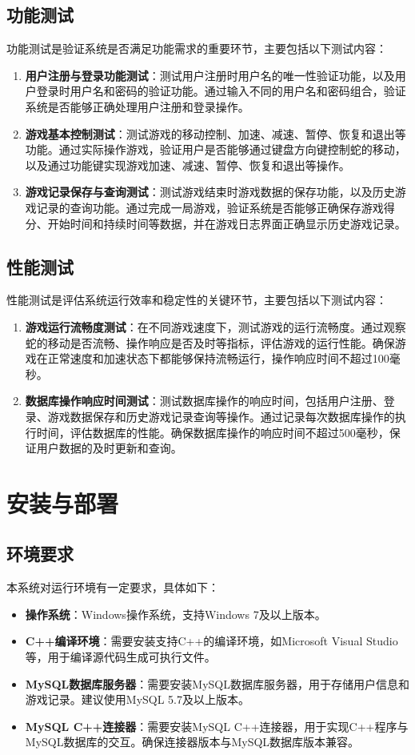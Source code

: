 \documentclass{article}
\begin{document}
\subsection{功能测试}
功能测试是验证系统是否满足功能需求的重要环节，主要包括以下测试内容：
\begin{enumerate}
    \item \textbf{用户注册与登录功能测试}：测试用户注册时用户名的唯一性验证功能，以及用户登录时用户名和密码的验证功能。通过输入不同的用户名和密码组合，验证系统是否能够正确处理用户注册和登录操作。
    \item \textbf{游戏基本控制测试}：测试游戏的移动控制、加速、减速、暂停、恢复和退出等功能。通过实际操作游戏，验证用户是否能够通过键盘方向键控制蛇的移动，以及通过功能键实现游戏加速、减速、暂停、恢复和退出等操作。
    \item \textbf{游戏记录保存与查询测试}：测试游戏结束时游戏数据的保存功能，以及历史游戏记录的查询功能。通过完成一局游戏，验证系统是否能够正确保存游戏得分、开始时间和持续时间等数据，并在游戏日志界面正确显示历史游戏记录。
\end{enumerate}

\subsection{性能测试}
性能测试是评估系统运行效率和稳定性的关键环节，主要包括以下测试内容：
\begin{enumerate}
    \item \textbf{游戏运行流畅度测试}：在不同游戏速度下，测试游戏的运行流畅度。通过观察蛇的移动是否流畅、操作响应是否及时等指标，评估游戏的运行性能。确保游戏在正常速度和加速状态下都能够保持流畅运行，操作响应时间不超过100毫秒。
    \item \textbf{数据库操作响应时间测试}：测试数据库操作的响应时间，包括用户注册、登录、游戏数据保存和历史游戏记录查询等操作。通过记录每次数据库操作的执行时间，评估数据库的性能。确保数据库操作的响应时间不超过500毫秒，保证用户数据的及时更新和查询。
\end{enumerate}

\section{安装与部署}

\subsection{环境要求}
本系统对运行环境有一定要求，具体如下：
\begin{itemize}
    \item \textbf{操作系统}：Windows操作系统，支持Windows 7及以上版本。
    \item \textbf{C++编译环境}：需要安装支持C++的编译环境，如Microsoft Visual Studio等，用于编译源代码生成可执行文件。
    \item \textbf{MySQL数据库服务器}：需要安装MySQL数据库服务器，用于存储用户信息和游戏记录。建议使用MySQL 5.7及以上版本。
    \item \textbf{MySQL C++连接器}：需要安装MySQL C++连接器，用于实现C++程序与MySQL数据库的交互。确保连接器版本与MySQL数据库版本兼容。
\end{itemize}
\end{document}
